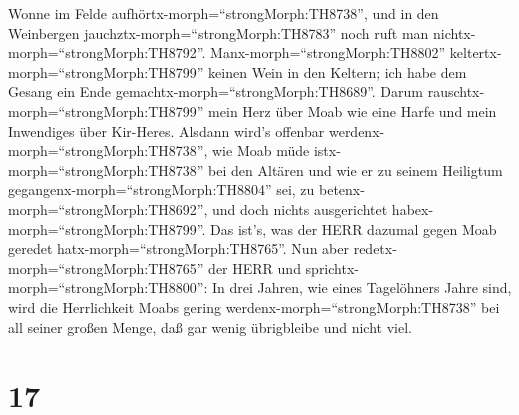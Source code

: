 Wonne im Felde aufhörtx-morph=``strongMorph:TH8738'', und in den
Weinbergen jauchztx-morph=``strongMorph:TH8783'' noch ruft man
nichtx-morph=``strongMorph:TH8792''. Manx-morph=``strongMorph:TH8802''
keltertx-morph=``strongMorph:TH8799'' keinen Wein in den Keltern; ich
habe dem Gesang ein Ende gemachtx-morph=``strongMorph:TH8689''.
 Darum rauschtx-morph=``strongMorph:TH8799'' mein Herz über
Moab wie eine Harfe und mein Inwendiges über Kir-Heres. 
Alsdann wird's offenbar werdenx-morph=``strongMorph:TH8738'', wie Moab
müde istx-morph=``strongMorph:TH8738'' bei den Altären und wie er zu
seinem Heiligtum gegangenx-morph=``strongMorph:TH8804'' sei, zu
betenx-morph=``strongMorph:TH8692'', und doch nichts ausgerichtet
habex-morph=``strongMorph:TH8799''.  Das ist's, was der
HERR dazumal gegen Moab geredet hatx-morph=``strongMorph:TH8765''.
 Nun aber redetx-morph=``strongMorph:TH8765'' der HERR und
sprichtx-morph=``strongMorph:TH8800'': In drei Jahren, wie eines
Tagelöhners Jahre sind, wird die Herrlichkeit Moabs gering
werdenx-morph=``strongMorph:TH8738'' bei all seiner großen Menge, daß
gar wenig übrigbleibe und nicht viel.

\hypertarget{section-16}{%
\section{17}\label{section-16}}

